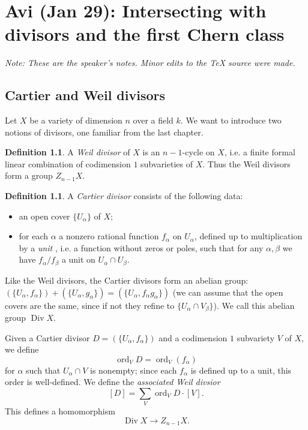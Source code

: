 \documentclass[leqno, openany]{memoir}
\theoremstyle{definition}
\newtheorem{defn}[thm]{Definition}
\theoremstyle{remark}
\theoremstyle{plain}
\theoremstyle{definition}
\theoremstyle{remark}
\DeclareMathOperator{\ord}{ord}
\DeclareMathOperator{\Div}{Div}
\begin{document}
\chapter{Avi (Jan 29): Intersecting with divisors and the first Chern class}%
\label{cha:avi_jan_29_intersecting_with_divisors_and_the_first_chern_class}

\textit{Note: These are the speaker's notes. Minor edits to the {\TeX} source were made.} 

\section{Cartier and Weil divisors}
Let $X$ be a variety of dimension $n$ over a field $k$. We want to introduce two notions of divisors, one familiar from the last chapter.

\begin{defn}
A \textit{Weil divisor} of $X$ is an $n-1$-cycle on $X$, i.e. a finite formal linear combination of codimension $1$ subvarieties of $X$. Thus the Weil divisors form a group $Z_{n-1} X$.
\end{defn}

\begin{defn}
A \textit{Cartier divisor}  consists of the following data:
\begin{itemize}
\item an open cover $\{U_\alpha\}$ of $X$;
\item for each $\alpha$ a nonzero rational function $f_\alpha$ on $U_\alpha$, defined up to multiplication by a \textit{unit} , i.e. a function without zeros or poles, such that for any $\alpha, \beta$ we have $f_\alpha/f_\beta$ a unit on $U_\alpha \cap U_\beta$.
\end{itemize}
\end{defn}

Like the Weil divisors, the Cartier divisors form an abelian group: $(\{U_\alpha, f_\alpha\}) + (\{U_\alpha, g_\alpha\}) = (\{U_\alpha, f_\alpha g_\alpha\})$ (we can assume that the open covers are the same, since if not they refine to $\{U_\alpha \cap V_\beta\}$). We call this abelian group $\Div X$.

Given a Cartier divisor $D = (\{U_\alpha, f_\alpha\})$ and a codimension $1$ subvariety $V$ of $X$, we define \[ \ord_V D = \ord_V (f_\alpha) \] for $\alpha$ such that $U_\alpha \cap V$ is nonempty; since each $f_\alpha$ is defined up to a unit, this order is well-defined. We define the \textit{associated Weil divsior} \[ [D] = \sum_V \ord_V D \cdot [V]. \] This defines a homomorphism \[ \Div X \to Z_{n-1} X. \]
\end{document}
